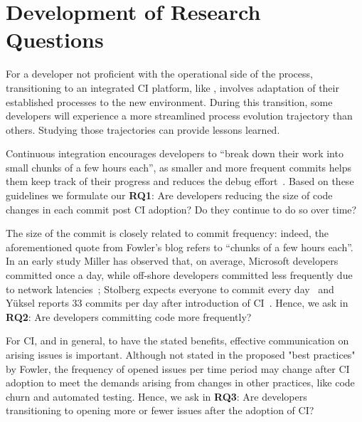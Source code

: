 
\section{Development of Research Questions}
\label{sec:background}

For a developer not proficient with the operational side of the process, 
transitioning to an integrated CI platform, like \Tvis, involves adaptation 
of their established processes to the new environment. 
During this transition, some developers will experience a more streamlined 
process evolution trajectory than others. 
Studying those trajectories can provide lessons learned.


%

Continuous integration encourages developers to ``break down their work 
into small chunks of a few hours each'', as smaller and more frequent commits 
helps them keep track of their progress and reduces the debug effort~\cite{Fowler,Duvall}. 
Based on these guidelines we formulate our \textbf{RQ1}: 
Are developers reducing the size of code changes in each commit post CI adoption? 
Do they continue to do so over time?

The size of the commit is closely related to commit frequency: indeed, the 
aforementioned quote from Fowler's blog refers to ``chunks of a few hours each''. 
In an early study Miller has observed that, on average, Microsoft developers 
committed once a day, while off-shore developers committed less frequently 
due to network latencies~\cite{Miller}; Stolberg expects everyone to commit every 
day~\cite{Stolberg} and Y\"{u}ksel reports 33 commits per day after introduction 
of CI~\cite{Yuksel}. 
Hence, we ask in \textbf{RQ2}: Are developers committing code more frequently?

For CI, and \DO in general, to have the stated benefits, effective communication on arising issues is important.
Although not stated in the proposed "best practices" by Fowler, the frequency of opened issues per time period may change after CI adoption to meet the demands arising from changes in other practices, like code churn and automated testing.
Hence, we ask in \textbf{RQ3}: 
Are developers transitioning to opening more or fewer issues after the adoption of CI?

